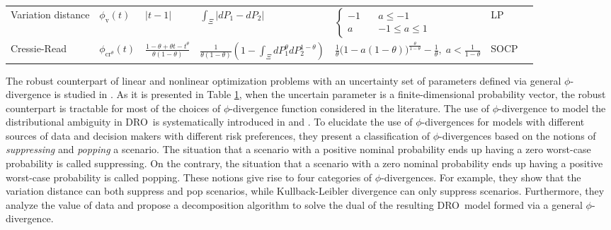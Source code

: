 \documentclass[final,onefignum,onetabnum]{class}
\makeatletter
\renewcommand\paragraph{\@startsection{paragraph}{4}{\z@}%
  {3.25ex \@plus1ex \@minus.2ex}%
  {-1em}%
  {\normalfont\normalsize\bfseries}}
\newcommand{\dro}{DRO}
\makeatother
\begin{document}
\begin{table}[!]
\begin{adjustbox}{max width=\textwidth}
\begin{tabular}{lllllll}
Variation distance  & $\phi_{\text{v}}(t)$ & $|t-1|$  & $\int_{\Xi} |d P_{1} - d P_{2}|$   & 
$\begin{cases}
-1 \quad & a\le -1 \\
a  \quad & -1 \le a \le 1
\end{cases}$ & LP    \\
Cressie-Read   & $\phi_{\text{cr}^{\theta}}(t)$ & $\frac{1-\theta+\theta t - t^{\theta}}{\theta(1-\theta)}$ & $\frac{1}{\theta(1-\theta)} (1-\int_{\Xi} d P_{1}^{\theta} d P_{2}^{1-\theta} )$  & $\frac{1}{\theta}\big(1-a(1-\theta)\big)^{\frac{\theta}{1-\theta}}-\frac{1}{\theta}, \; a < \frac{1}{1-\theta}$ & SOCP\\
\bottomrule
\end{tabular}
\end{adjustbox}
\label{T: rev.phi}
\end{table}


The robust counterpart
of linear and nonlinear optimization problems with an uncertainty set of parameters defined via general $\phi$-divergence is studied in \citet{ben2013}. As it is presented in Table \ref{T: rev.phi}, when  the uncertain parameter is a finite-dimensional probability vector, the robust counterpart is tractable for most of the choices of $\phi$-divergence function considered in the literature. 
The use of $\phi$-divergence to model the distributional ambiguity in \dro\ is  systematically introduced in \citet{bayraksan2015} and \citet{love2015}. To elucidate  the use of $\phi$-divergences for models with different sources of data and
decision makers with different risk preferences, they  present a classification of
$\phi$-divergences based on the notions of {\it suppressing} and {\it popping} a scenario. 
The situation that a scenario with a positive nominal probability  ends up having a zero worst-case probability is called suppressing. On the contrary, the situation that a scenario with a zero nominal probability  ends up having a positive worst-case probability is called popping.
These notions give rise to four categories of $\phi$-divergences. For example, they show that the variation distance can both suppress and pop scenarios, while Kullback-Leibler divergence  can only suppress scenarios. Furthermore, they analyze the value of data and propose a  decomposition algorithm to solve the dual of the resulting \dro\ model formed via a general $\phi$-divergence. 

\end{document}
